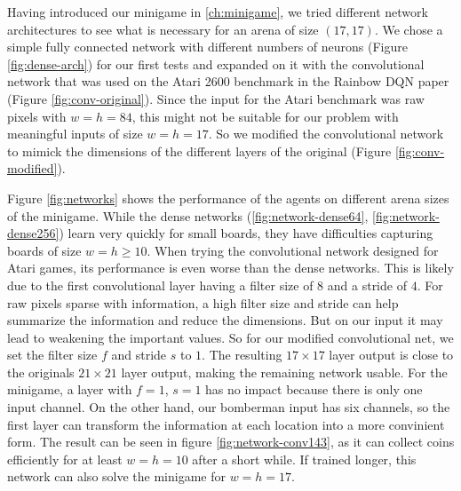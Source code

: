 
Having introduced our minigame in \ref{ch:minigame}, we tried different network architectures to see what is necessary for an arena of size $(17, 17)$.
We chose a simple fully connected network with different numbers of neurons (Figure \ref{fig:dense-arch}) for our first tests and expanded on it with the convolutional network that was used on the Atari 2600 benchmark in the Rainbow DQN paper\cite{Hessel2018RainbowCI} (Figure \ref{fig:conv-original}). Since the input for the Atari benchmark was raw pixels with $w=h=84$, this might not be suitable for our problem with meaningful inputs of size $w=h=17$. So we modified the convolutional network to mimick the dimensions of the different layers of the original (Figure \ref{fig:conv-modified}).

Figure \ref{fig:networks} shows the performance of the agents on different arena sizes of the minigame. While the dense networks (\ref{fig:network-dense64}, \ref{fig:network-dense256}) learn very quickly for small boards, they have difficulties capturing boards of size $w=h\geq10$. When trying the convolutional network designed for Atari games, its performance is even worse than the dense networks. This is likely due to the first convolutional layer having a filter size of $8$ and a stride of $4$. For raw pixels sparse with information, a high filter size and stride can help summarize the information and reduce the dimensions. But on our input it may lead to weakening the important values.
So for our modified convolutional net, we set the filter size $f$ and stride $s$ to $1$. The resulting $17\times17$ layer output is close to the originals $21\times21$ layer output, making the remaining network usable. For the minigame, a layer with $f=1$, $s=1$ has no impact because there is only one input channel. On the other hand, our bomberman input has six channels, so the first layer can transform the information at each location into a more convinient form. The result can be seen in figure \ref{fig:network-conv143}, as it can collect coins efficiently for at least $w=h=10$ after a short while. If trained longer, this network can also solve the minigame for $w=h=17$.





